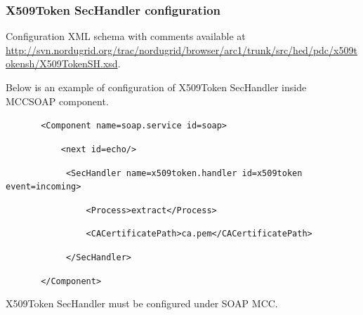 \documentclass{article}
\newcommand\textstyleInternetlink[1]{\textcolor[rgb]{0.0,0.0,0.5019608}{#1}}
\begin{document}
\subsubsection[X509Token SecHandler configuration]{X509Token SecHandler
configuration}
{\upshape\color{black}
Configuration XML schema with comments available at
\href{http://svn.nordugrid.org/trac/nordugrid/browser/arc1/trunk/src/hed/pdc/usernametokensh/UsernameTokenSH.xsd}{\textstyleInternetlink{http://svn.nordugrid.org/trac/nordugrid/browser/arc1/trunk/src/hed/pdc/x509tokensh/X509TokenSH.xsd}}.}

{\upshape\color{black}
Below is an example of configuration of X509Token SecHandler inside
MCCSOAP component.}

{\upshape\color{black}
\texttt{\ \ \ \ \ \ \ {\textless}Component
name={\textquotedbl}soap.service{\textquotedbl}
id={\textquotedbl}soap{\textquotedbl}{\textgreater}}}

{\upshape\color{black}
\texttt{\ \ \ \ \ \ \ \ \ \ \ {\textless}next
id={\textquotedbl}echo{\textquotedbl}/{\textgreater}}}

{\upshape\color{black}
\texttt{\ \ \ \ \ \ \ \ \ \ \ \ {\textless}SecHandler
name={\textquotedbl}x509token.handler{\textquotedbl}
id={\textquotedbl}x509token{\textquotedbl}
event={\textquotedbl}incoming{\textquotedbl}{\textgreater}}}


\bigskip

{\upshape\color{black}
\texttt{\ \ \ \ \ \ \ \ \ \ \ \ \ \ \ \ {\textless}Process{\textgreater}extract{\textless}/Process{\textgreater}}}


\bigskip

{\upshape\color{black}
\texttt{\ \ \ \ \ \ \ \ \ \ \ \ \ \ \ \ {\textless}CACertificatePath{\textgreater}ca.pem{\textless}/CACertificatePath{\textgreater}}}


\bigskip

{\upshape\color{black}
\texttt{\ \ \ \ \ \ \ \ \ \ \ \ {\textless}/SecHandler{\textgreater}}}


\bigskip

{\upshape\color{black}
\texttt{\ \ \ \ \ \ \ {\textless}/Component{\textgreater}}}

{\upshape\color{black}
X509Token SecHandler must be configured under SOAP MCC.}
\end{document}
